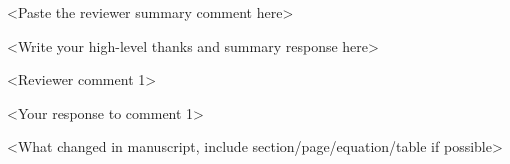 
\reviewer

\begin{generalcomment}
  <Paste the reviewer summary comment here>
\end{generalcomment}
\begin{revmeta}[]
  <Write your high-level thanks and summary response here>
\end{revmeta}

\begin{commentresponse}
  {\begin{revcomment}
    <Reviewer comment 1>
  \end{revcomment}}
  {\begin{response}
    <Your response to comment 1>
  \end{response}}
  {\begin{changes}
    <What changed in manuscript, include section/page/equation/table if possible>
  \end{changes}}
\end{commentresponse}

